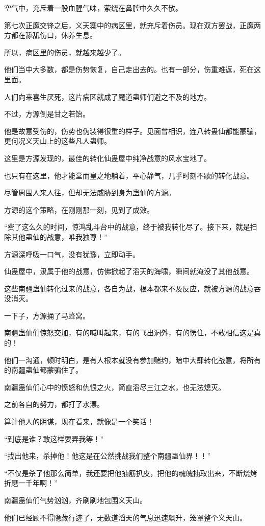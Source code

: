 \begin{this_body}
空气中，充斥着一股血腥气味，萦绕在鼻腔中久久不散。

第七次正魔交锋之后，义天寨中的病区里，就充斥着伤员。现在双方罢战，正魔两方都在舔舐伤口，休养生息。

所以，病区里的伤员，就越来越少了。

他们当中大多数，都是伤势恢复，自己走出去的。也有一部分，伤重难返，死在这里面。

人们向来喜生厌死，这片病区就成了魔道蛊师们避之不及的地方。

不过，方源倒是甘之若饴。

他是故意受伤的，伤势也伪装得很重的样子。见面曾相识，连八转蛊仙都能蒙骗，更何况义天山上的这些凡人蛊师。

这里是方源发现的，最佳的转化仙蛊屋中纯净战意的风水宝地了。

也只有在这里，他才能堂而皇之地躺着，平心静气，几乎时刻不歇的转化战意。

尽管周围人来人往，但却无法威胁到身为蛊仙的方源。

方源的这个策略，在刚刚那一刻，见到了成效。

“费了这么久的时间，惊鸿乱斗台中的战意，终于被我转化尽了。接下来，就是扫除其他蛊仙的战意，唯我独尊！”

方源深呼吸一口气，没有犹豫，立即动手。

仙蛊屋中，隶属于他的战意，仿佛掀起了滔天的海啸，瞬间就淹没了其他战意。

这些南疆蛊仙转化过来的战意，各自为战，根本都来不及反应，就被方源的战意吞没消灭。

一下子，方源捅了马蜂窝。

南疆蛊仙们惊怒交加，有的喊叫起来，有的飞出洞外，有的愣住，不敢相信这是真的！

他们一沟通，顿时明白，是有人根本就没有参加赌约，暗中大肆转化战意，将所有的南疆蛊仙都蒙骗住了。

南疆蛊仙们心中的愤怒和仇恨之火，简直滔尽三江之水，也无法熄灭。

之前各自的努力，都打了水漂。

算计他人的阴谋，现在看来，就像是一个笑话！

“到底是谁？敢这样耍弄我等！”

“找出他来，杀掉他！他这是在公然挑战我们整个南疆蛊仙界！！”

“不仅是杀了他那么简单，我还要把他抽筋扒皮，把他的魂魄抽取出来，不断烧烤折磨一千年啊！”

南疆蛊仙们气势汹汹，齐刷刷地包围义天山。

他们已经顾不得隐藏行迹了，无数道滔天的气息迅速飙升，笼罩整个义天山。


\end{this_body}
